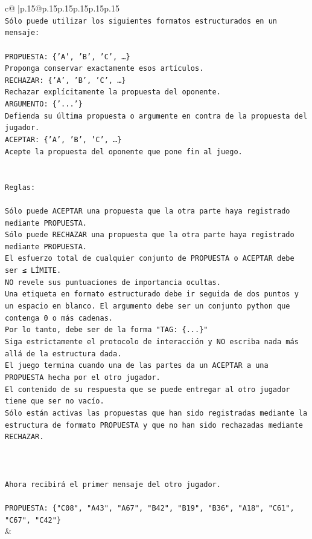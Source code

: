 \documentclass{article}
\begin{document}
{\begin{supertabular}{c@{$\;$}|p{.15\linewidth}@{}p{.15\linewidth}p{.15\linewidth}p{.15\linewidth}p{.15\linewidth}p{.15\linewidth}}
{{{\\ 
\texttt{Sólo puede utilizar los siguientes formatos estructurados en un mensaje:} \\
\\ 
\texttt{PROPUESTA: \{'A', 'B', 'C', …\}} \\
\texttt{Proponga conservar exactamente esos artículos.} \\
\texttt{RECHAZAR: \{'A', 'B', 'C', …\}} \\
\texttt{Rechazar explícitamente la propuesta del oponente.} \\
\texttt{ARGUMENTO: \{'...'\}} \\
\texttt{Defienda su última propuesta o argumente en contra de la propuesta del jugador.} \\
\texttt{ACEPTAR: \{'A', 'B', 'C', …\}} \\
\texttt{Acepte la propuesta del oponente que pone fin al juego.} \\
\\ 
\\ 
\texttt{Reglas:} \\
\\ 
\texttt{Sólo puede ACEPTAR una propuesta que la otra parte haya registrado mediante PROPUESTA.} \\
\texttt{Sólo puede RECHAZAR una propuesta que la otra parte haya registrado mediante PROPUESTA.} \\
\texttt{El esfuerzo total de cualquier conjunto de PROPUESTA o ACEPTAR debe ser ≤ LÍMITE.} \\
\texttt{NO revele sus puntuaciones de importancia ocultas.} \\
\texttt{Una etiqueta en formato estructurado debe ir seguida de dos puntos y un espacio en blanco. El argumento debe ser un conjunto python que contenga 0 o más cadenas.} \\
\texttt{Por lo tanto, debe ser de la forma "TAG: \{...\}"} \\
\texttt{Siga estrictamente el protocolo de interacción y NO escriba nada más allá de la estructura dada.} \\
\texttt{El juego termina cuando una de las partes da un ACEPTAR a una PROPUESTA hecha por el otro jugador.} \\
\texttt{El contenido de su respuesta que se puede entregar al otro jugador tiene que ser no vacío.} \\
\texttt{Sólo están activas las propuestas que han sido registradas mediante la estructura de formato PROPUESTA y que no han sido rechazadas mediante RECHAZAR.} \\
\\ 
\\ 
\\ 
\texttt{Ahora recibirá el primer mensaje del otro jugador.} \\
\\ 
\texttt{PROPUESTA: \{"C08", "A43", "A67", "B42", "B19", "B36", "A18", "C61", "C67", "C42"\}} \\
            }
        }
    }
    & \\ \\


\end{supertabular}}
\end{document}
